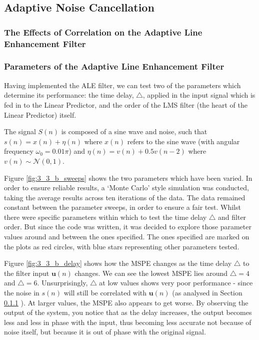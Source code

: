 \documentclass[./main.tex]{subfiles}
\begin{document}
\subsection{Adaptive Noise Cancellation}


\subsubsection{The Effects of Correlation on the Adaptive Line Enhancement Filter} \label{sec:3_3_a}


\subsubsection{Parameters of the Adaptive Line Enhancement Filter}
Having implemented the ALE filter, we can test two of the parameters which determine its performance: the time delay, $ \bigtriangleup $, applied in the input signal which is fed in to the Linear Predictor, and the order of the LMS filter (the heart of the Linear Predictor) itself.

The signal $S(n)$ is composed of a sine wave and noise, such that $ s(n) = x(n) + \eta(n) $ where $x(n)$ refers to the sine wave (with angular frequency $ \omega_0 = 0.01\pi$) and $ \eta(n) = v(n) + 0.5v(n-2) $ where $v(n) \sim \mathcal{N}(0,1) $.

Figure \ref{fig:3_3_b_sweeps} shows the two parameters which have been varied. In order to ensure reliable results, a `Monte Carlo' style simulation was conducted, taking the average results across ten iterations of the data. The data remained constant between the parameter sweeps, in order to ensure a fair test. Whilst there were specific parameters within which to test the time delay $ \bigtriangleup $ and filter order. But since the code was written, it was decided to explore those parameter values around and between the ones specified. The ones specified are marked on the plots as red circles, with blue stars representing other parameters tested.

Figure \ref{fig:3_3_b_delay} shows how the MSPE changes as the time delay  $ \bigtriangleup $ to the filter input $ \mathbf{u}(n) $ changes. We can see the lowest MSPE lies around $ \bigtriangleup = 4 $ and $ \bigtriangleup = 6$. Unsurprisingly, $ \bigtriangleup $ at low values shows very poor performance - since the noise in $ s(n) $ will still be correlated with $ \mathbf{u}(n) $ (as analysed in Section \ref{sec:3_3_a} ). At larger values, the MSPE also appears to get worse. By observing the output of the system, you notice that as the delay increases, the output becomes less and less in phase with the input, thus becoming less accurate not because of noise itself, but because it is out of phase with the original signal.
\end{document}
